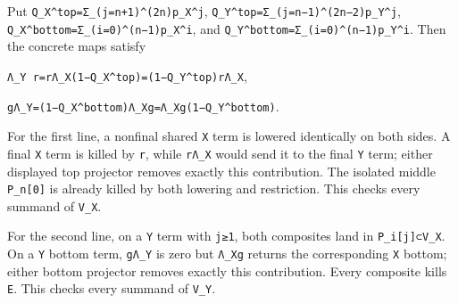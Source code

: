 \documentclass[
  10pt,
]{article}
\begin{document}
Put
\texttt{\small Q\_\allowbreak{}X\textasciicircum{}top=\allowbreak{}Σ\_\allowbreak{}(\allowbreak{}j=\allowbreak{}n+\allowbreak{}1)\allowbreak{}\textasciicircum{}(\allowbreak{}2n)\allowbreak{}p\_\allowbreak{}X\textasciicircum{}j},
\texttt{\small Q\_\allowbreak{}Y\textasciicircum{}top=\allowbreak{}Σ\_\allowbreak{}(\allowbreak{}j=\allowbreak{}n−1)\allowbreak{}\textasciicircum{}(\allowbreak{}2n−2)\allowbreak{}p\_\allowbreak{}Y\textasciicircum{}j},
\texttt{\small Q\_\allowbreak{}X\textasciicircum{}bottom=\allowbreak{}Σ\_\allowbreak{}(\allowbreak{}i=\allowbreak{}0)\allowbreak{}\textasciicircum{}(\allowbreak{}n−1)\allowbreak{}p\_\allowbreak{}X\textasciicircum{}i},
and
\texttt{\small Q\_\allowbreak{}Y\textasciicircum{}bottom=\allowbreak{}Σ\_\allowbreak{}(\allowbreak{}i=\allowbreak{}0)\allowbreak{}\textasciicircum{}(\allowbreak{}n−1)\allowbreak{}p\_\allowbreak{}Y\textasciicircum{}i}.
Then the concrete maps satisfy

\texttt{\small Λ\_\allowbreak{}Y r=\allowbreak{}rΛ\_\allowbreak{}X(\allowbreak{}1−Q\_\allowbreak{}X\textasciicircum{}top)\allowbreak{}=\allowbreak{}(\allowbreak{}1−Q\_\allowbreak{}Y\textasciicircum{}top)\allowbreak{}rΛ\_\allowbreak{}X},

\texttt{\small gΛ\_\allowbreak{}Y=\allowbreak{}(\allowbreak{}1−Q\_\allowbreak{}X\textasciicircum{}bottom)\allowbreak{}Λ\_\allowbreak{}Xg=\allowbreak{}Λ\_\allowbreak{}Xg(\allowbreak{}1−Q\_\allowbreak{}Y\textasciicircum{}bottom)\allowbreak{}}.

For the first line, a nonfinal shared \texttt{\small X} term is lowered
identically on both sides. A final \texttt{\small X} term is killed by
\texttt{\small r}, while \texttt{\small rΛ\_\allowbreak{}X} would send
it to the final \texttt{\small Y} term; either displayed top projector
removes exactly this contribution. The isolated middle
\texttt{\small P\_\allowbreak{}n[\allowbreak{}0]\allowbreak{}} is
already killed by both lowering and restriction. This checks every
summand of \texttt{\small V\_\allowbreak{}X}.

For the second line, on a \texttt{\small Y} term with
\texttt{\small j≥\allowbreak{}1}, both composites land in
\texttt{\small P\_\allowbreak{}i[\allowbreak{}j]\allowbreak{}⊂V\_\allowbreak{}X}.
On a \texttt{\small Y} bottom term, \texttt{\small gΛ\_\allowbreak{}Y}
is zero but \texttt{\small Λ\_\allowbreak{}Xg} returns the corresponding
\texttt{\small X} bottom; either bottom projector removes exactly this
contribution. Every composite kills \texttt{\small E}. This checks every
summand of \texttt{\small V\_\allowbreak{}Y}.
\end{document}
